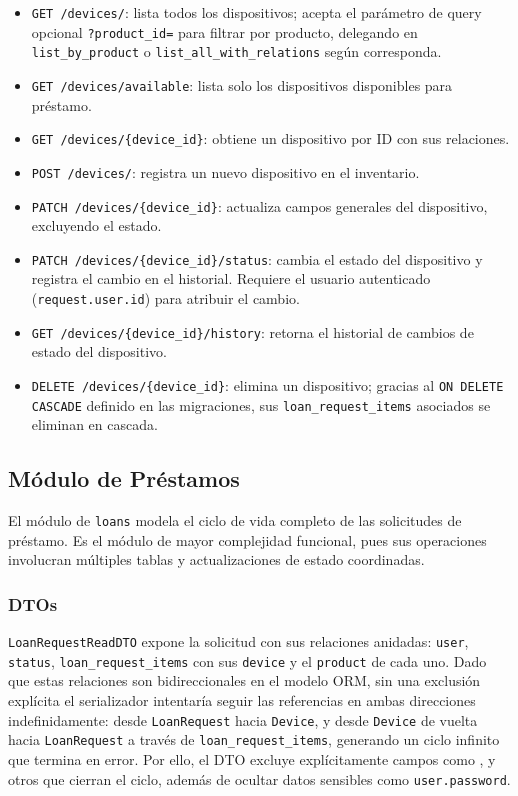 \begin{itemize}
	\item \texttt{GET /devices/}: lista todos los dispositivos; acepta el parámetro de query opcional \texttt{?product\_id=} para filtrar por producto, delegando en \texttt{list\_by\_product} o \texttt{list\_all\_with\_relations} según corresponda.
	\item \texttt{GET /devices/available}: lista solo los dispositivos disponibles para préstamo.
	\item \texttt{GET /devices/\{device\_id\}}: obtiene un dispositivo por ID con sus relaciones.
	\item \texttt{POST /devices/}: registra un nuevo dispositivo en el inventario.
	\item \texttt{PATCH /devices/\{device\_id\}}: actualiza campos generales del dispositivo, excluyendo el estado.
	\item \texttt{PATCH /devices/\{device\_id\}/status}: cambia el estado del dispositivo y registra el cambio en el historial. Requiere el usuario autenticado (\texttt{request.user.id}) para atribuir el cambio.
	\item \texttt{GET /devices/\{device\_id\}/history}: retorna el historial de cambios de estado del dispositivo.
	\item \texttt{DELETE /devices/\{device\_id\}}: elimina un dispositivo; gracias al \texttt{ON DELETE CASCADE} definido en las migraciones, sus \texttt{loan\_request\_items} asociados se eliminan en cascada.
\end{itemize}

\subsection{Módulo de Préstamos}\label{sec:backend_prestamos}

El módulo de \texttt{loans} modela el ciclo de vida completo de las solicitudes de préstamo. Es el módulo de mayor complejidad funcional, pues sus operaciones involucran múltiples tablas y actualizaciones de estado coordinadas.

\subsubsection*{DTOs}

\texttt{LoanRequestReadDTO} expone la solicitud con sus relaciones anidadas: 
\texttt{user}, \texttt{status}, \texttt{loan\_request\_items} con sus \texttt{device} 
y el \texttt{product} de cada uno. Dado que estas relaciones son bidireccionales en el 
modelo ORM, sin una exclusión explícita el serializador intentaría seguir las referencias 
en ambas direcciones indefinidamente: desde \texttt{LoanRequest} hacia \texttt{Device}, 
y desde \texttt{Device} de vuelta hacia \texttt{LoanRequest} a través de 
\texttt{loan\_request\_items}, generando un ciclo infinito que termina en error. Por 
ello, el DTO excluye explícitamente campos como , 
 y otros que cierran el ciclo, 
además de ocultar datos sensibles como \texttt{user.password}.


